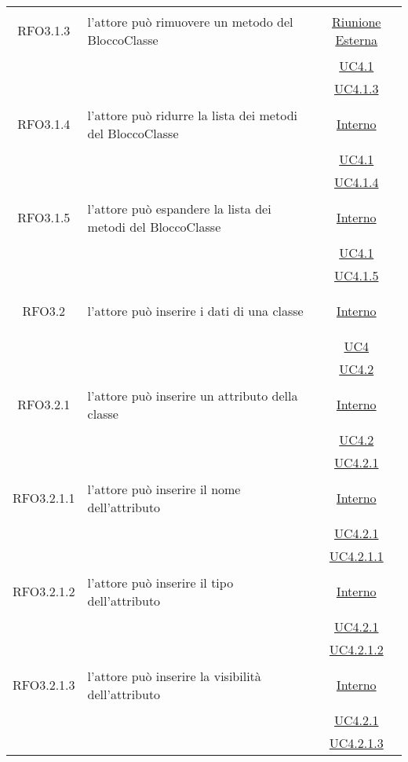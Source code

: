 \begin{longtable}{|c|>{\centering}m{7cm}|c|}
\hypertarget{RFO3.1.3}{RFO3.1.3} & l'attore può rimuovere un metodo del BloccoClasse & \hyperlink{Riunione Esterna}{Riunione Esterna}\\
& &\hyperref[UC4.1]{UC4.1}\\
& &\hyperref[UC4.1.3]{UC4.1.3}\\ \hline

\hypertarget{RFO3.1.4}{RFO3.1.4} & l'attore può ridurre la lista dei metodi del BloccoClasse & \hyperlink{Interno}{Interno}\\
& &\hyperref[UC4.1]{UC4.1}\\
& &\hyperref[UC4.1.4]{UC4.1.4}\\ \hline

\hypertarget{RFO3.1.5}{RFO3.1.5} & l'attore può espandere la lista dei metodi del BloccoClasse & \hyperlink{Interno}{Interno}\\
& &\hyperref[UC4.1]{UC4.1}\\
& &\hyperref[UC4.1.5]{UC4.1.5}\\ \hline

\hypertarget{RFO3.2}{RFO3.2} & l'attore può inserire i dati di una classe & \hyperlink{Interno}{Interno}\\
& &\hyperref[UC4]{UC4}\\
& &\hyperref[UC4.2]{UC4.2}\\ \hline

\hypertarget{RFO3.2.1}{RFO3.2.1} & l'attore può inserire un attributo della classe & \hyperlink{Interno}{Interno}\\
& &\hyperref[UC4.2]{UC4.2}\\
& &\hyperref[UC4.2.1]{UC4.2.1}\\ \hline

\hypertarget{RFO3.2.1.1}{RFO3.2.1.1} & l'attore può inserire il nome dell'attributo & \hyperlink{Interno}{Interno}\\
& &\hyperref[UC4.2.1]{UC4.2.1}\\
& &\hyperref[UC4.2.1.1]{UC4.2.1.1}\\ \hline

\hypertarget{RFO3.2.1.2}{RFO3.2.1.2} & l'attore può inserire il tipo dell'attributo & \hyperlink{Interno}{Interno}\\
& &\hyperref[UC4.2.1]{UC4.2.1}\\
& &\hyperref[UC4.2.1.2]{UC4.2.1.2}\\ \hline

\hypertarget{RFO3.2.1.3}{RFO3.2.1.3} & l'attore può inserire la visibilità dell'attributo & \hyperlink{Interno}{Interno}\\
& &\hyperref[UC4.2.1]{UC4.2.1}\\
& &\hyperref[UC4.2.1.3]{UC4.2.1.3}\\ \hline


\end{longtable}
